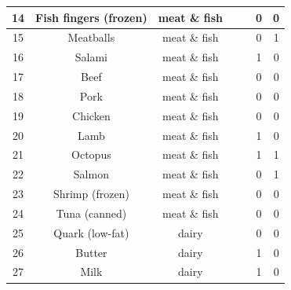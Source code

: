 \documentclass[
  letterpaper,
  DIV=11,
  numbers=noendperiod]{scrartcl}
\begin{document}
\begin{tabular}[t]{c|c|c|>{}c|>{}c|c|c}
\hline
14 & Fish fingers (frozen) & meat \& fish & \cellcolor[HTML]{3E4C8A}{\textcolor{white}{6400}} & \cellcolor[HTML]{3D4E8A}{\textcolor{white}{188}} & 0 & 0\\
\hline
15 & Meatballs & meat \& fish & \cellcolor[HTML]{414487}{\textcolor{white}{5670}} & \cellcolor[HTML]{375A8C}{\textcolor{white}{217}} & 0 & 1\\
\hline
16 & Salami & meat \& fish & \cellcolor[HTML]{433E85}{\textcolor{white}{5060}} & \cellcolor[HTML]{37B878}{\textcolor{white}{502}} & 1 & 0\\
\hline
17 & Beef & meat \& fish & \cellcolor[HTML]{FDE725}{\textcolor{white}{26920}} & \cellcolor[HTML]{482979}{\textcolor{white}{98}} & 0 & 0\\
\hline
18 & Pork & meat \& fish & \cellcolor[HTML]{3D4E8A}{\textcolor{white}{6620}} & \cellcolor[HTML]{433E85}{\textcolor{white}{147}} & 0 & 0\\
\hline
19 & Chicken & meat \& fish & \cellcolor[HTML]{453882}{\textcolor{white}{4640}} & \cellcolor[HTML]{472A7A}{\textcolor{white}{102}} & 0 & 0\\
\hline
20 & Lamb & meat \& fish & \cellcolor[HTML]{B2DD2D}{\textcolor{white}{23900}} & \cellcolor[HTML]{472F7D}{\textcolor{white}{112}} & 1 & 0\\
\hline
21 & Octopus & meat \& fish & \cellcolor[HTML]{3E4989}{\textcolor{white}{6170}} & \cellcolor[HTML]{481D6F}{\textcolor{white}{73}} & 1 & 1\\
\hline
22 & Salmon & meat \& fish & \cellcolor[HTML]{3C508B}{\textcolor{white}{6820}} & \cellcolor[HTML]{3E4C8A}{\textcolor{white}{180}} & 0 & 1\\
\hline
23 & Shrimp (frozen) & meat \& fish & \cellcolor[HTML]{26828E}{\textcolor{white}{12100}} & \cellcolor[HTML]{481769}{\textcolor{white}{60}} & 0 & 0\\
\hline
24 & Tuna (canned) & meat \& fish & \cellcolor[HTML]{38598C}{\textcolor{white}{7590}} & \cellcolor[HTML]{472E7C}{\textcolor{white}{110}} & 0 & 0\\
\hline
25 & Quark (low-fat) & dairy & \cellcolor[HTML]{481F70}{\textcolor{white}{2450}} & \cellcolor[HTML]{481C6E}{\textcolor{white}{70}} & 0 & 0\\
\hline
26 & Butter & dairy & \cellcolor[HTML]{2C718E}{\textcolor{white}{10180}} & \cellcolor[HTML]{FDE725}{\textcolor{white}{741}} & 1 & 0\\
\hline
27 & Milk & dairy & \cellcolor[HTML]{481668}{\textcolor{white}{1800}} & \cellcolor[HTML]{471164}{\textcolor{white}{46}} & 1 & 0\\

\end{tabular}
\end{document}
